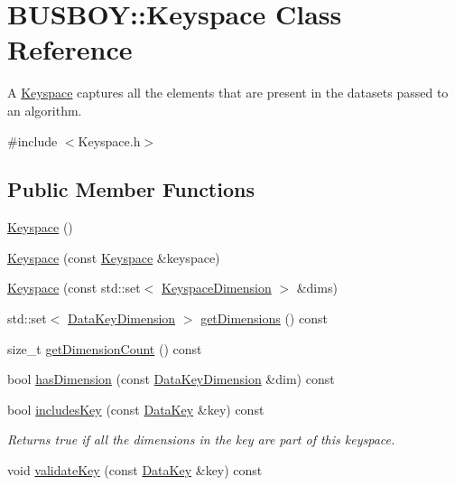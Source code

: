 \hypertarget{classBUSBOY_1_1Keyspace}{
\section{BUSBOY::Keyspace Class Reference}
\label{classBUSBOY_1_1Keyspace}
}


A \hyperlink{classBUSBOY_1_1Keyspace}{Keyspace} captures all the elements that are present in the datasets passed to an algorithm.  


{\ttfamily \#include $<$Keyspace.h$>$}\subsection*{Public Member Functions}
\begin{DoxyCompactItemize}
\item 
\hyperlink{classBUSBOY_1_1Keyspace_ab28c7c02951f2d00fe597436265db003}{Keyspace} ()
\item 
\hyperlink{classBUSBOY_1_1Keyspace_a4b7c17e4d39d0eb33874feded0d27717}{Keyspace} (const \hyperlink{classBUSBOY_1_1Keyspace}{Keyspace} \&keyspace)
\item 
\hyperlink{classBUSBOY_1_1Keyspace_adcff93819cb8832b5937c304b198071b}{Keyspace} (const std::set$<$ \hyperlink{classBUSBOY_1_1KeyspaceDimension}{KeyspaceDimension} $>$ \&dims)
\item 
std::set$<$ \hyperlink{classBUSBOY_1_1DataKeyDimension}{DataKeyDimension} $>$ \hyperlink{classBUSBOY_1_1Keyspace_af5198ef0ed516b3f9930aee531a74301}{getDimensions} () const 
\item 
size\_\-t \hyperlink{classBUSBOY_1_1Keyspace_a6231d9b8c2ad0cb3805d8faab048aa8a}{getDimensionCount} () const 
\item 
bool \hyperlink{classBUSBOY_1_1Keyspace_ab2c66ef737eab0700d89329481931218}{hasDimension} (const \hyperlink{classBUSBOY_1_1DataKeyDimension}{DataKeyDimension} \&dim) const 
\item 
bool \hyperlink{classBUSBOY_1_1Keyspace_a76c9ccb68e6856806ef0099fd866cf0f}{includesKey} (const \hyperlink{classBUSBOY_1_1DataKey}{DataKey} \&key) const 
\begin{DoxyCompactList}\small\item\em Returns true if all the dimensions in the key are part of this keyspace. \item\end{DoxyCompactList}\item 
void \hyperlink{classBUSBOY_1_1Keyspace_ad12844863186fdf168f7399307471ccd}{validateKey} (const \hyperlink{classBUSBOY_1_1DataKey}{DataKey} \&key) const 

\end{DoxyCompactItemize}

